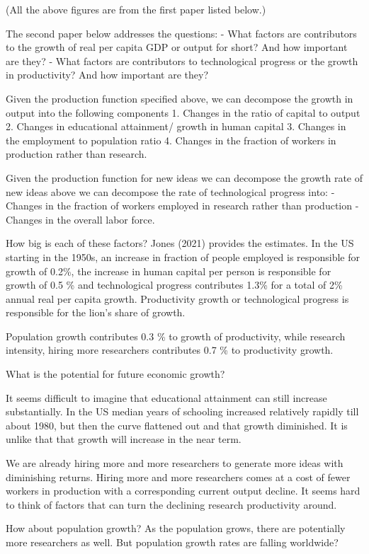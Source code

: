 \documentclass[
]{book}
\begin{document}
(All the above figures are from the first paper listed below.)

The second paper below addresses the questions:
- What factors are contributors to the growth of real per capita GDP or output for short? And how important are they?
- What factors are contributors to technological progress or the growth in productivity? And how important are they?

Given the production function specified above, we can decompose the growth in output into the following components
1. Changes in the ratio of capital to output
2. Changes in educational attainment/ growth in human capital
3. Changes in the employment to population ratio
4. Changes in the fraction of workers in production rather than research.

Given the production function for new ideas we can decompose the growth rate of new ideas above we can decompose the rate of technological progress into:
- Changes in the fraction of workers employed in research rather than production
- Changes in the overall labor force.

How big is each of these factors? Jones (2021) provides the estimates. In the US starting in the 1950s, an increase in fraction of people employed is responsible for growth of 0.2\%, the increase in human capital per person is responsible for growth of 0.5 \% and technological progress contributes 1.3\% for a total of 2\% annual real per capita growth. Productivity growth or technological progress is responsible for the lion's share of growth.

Population growth contributes 0.3 \% to growth of productivity, while research intensity, hiring more researchers contributes 0.7 \% to productivity growth.

What is the potential for future economic growth?

It seems difficult to imagine that educational attainment can still increase substantially. In the US median years of schooling increased relatively rapidly till about 1980, but then the curve flattened out and that growth diminished. It is unlike that that growth will increase in the near term.

We are already hiring more and more researchers to generate more ideas with diminishing returns. Hiring more and more researchers comes at a cost of fewer workers in production with a corresponding current output decline. It seems hard to think of factors that can turn the declining research productivity around.

How about population growth? As the population grows, there are potentially more researchers as well. But population growth rates are falling worldwide?
\end{document}
